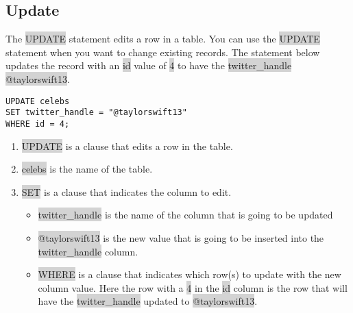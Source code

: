 \documentclass[11pt]{article}
\begin{document}
\subsection{Update}
The \colorbox{lightgray}{UPDATE} statement edits a row in a table. You can use the \colorbox{lightgray}{UPDATE} statement when you want to change existing records. The statement below updates the record with an \colorbox{lightgray}{id} value of \colorbox{lightgray}{4} to have the \colorbox{lightgray}{twitter\_handle} \colorbox{lightgray}{@taylorswift13}.
\begin{lstlisting}
UPDATE celebs 
SET twitter_handle = "@taylorswift13"
WHERE id = 4; 
\end{lstlisting}
\begin{enumerate}[leftmargin = *]
\item \colorbox{lightgray}{UPDATE} is a clause that edits a row in the table.
\item \colorbox{lightgray}{celebs} is the name of the table.
\item \colorbox{lightgray}{SET} is a clause that indicates the column to edit.
\begin{itemize}
\item \colorbox{lightgray}{twitter\_handle} is the name of the column that is going to be updated
\item \colorbox{lightgray}{@taylorswift13} is the new value that is going to be inserted into the \colorbox{lightgray}{twitter\_handle} column.
\item \colorbox{lightgray}{WHERE} is a clause that indicates which row(s) to update with the new column value. Here the row with a \colorbox{lightgray}{4} in the \colorbox{lightgray}{id} column is the row that will have the \colorbox{lightgray}{twitter\_handle} updated to \colorbox{lightgray}{@taylorswift13}.
\end{itemize}
\end{enumerate}
\end{document}
